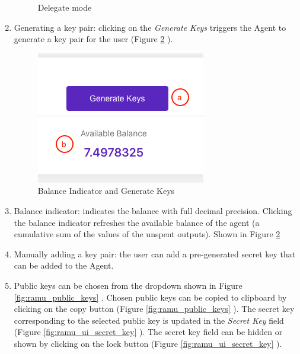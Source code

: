 \begin{enumerate}
\begin{figure}[!htb]
		  \caption{Delegate mode}
		\label{fig:ramu_ui_delegate_mode}
		\endminipage
	\end{figure}

	\item Generating a key pair: clicking on the \textit{Generate Keys} triggers the Agent to generate a key pair for the user (Figure \ref{fig:ramu_ui_balance_keys} ).
	\begin{figure}[htbp]
		\centering
		\includegraphics[width=0.3\linewidth]{figures/images/ramu/t_balance_and_keys.png}
		\caption{Balance Indicator and Generate Keys}
		\label{fig:ramu_ui_balance_keys}
	\end{figure}

	\item Balance indicator: indicates the balance with full decimal precision. Clicking the balance indicator refreshes the available balance of the agent (a cumulative sum of the values of the unspent outputs). Shown in Figure \ref{fig:ramu_ui_balance_keys} 


	\item Manually adding a key pair: the user can add a pre-generated secret key that can be added to the Agent.
	
	\item Public keys can be chosen from the dropdown shown in Figure \ref{fig:ramu_public_keys} . Chosen public keys can be copied to clipboard by clicking on the copy button (Figure \ref{fig:ramu_public_keys} ). The secret key corresponding to the selected public key is updated in the \textit{Secret Key} field (Figure \ref{fig:ramu_ui_secret_key} ). The secret key field can be hidden or shown by clicking on the lock button (Figure \ref{fig:ramu_ui_secret_key} ).
	

\end{enumerate}
